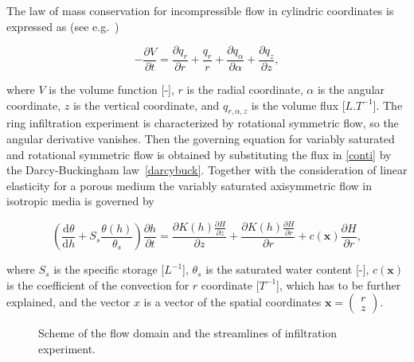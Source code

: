 \documentclass[review]{myarticle}
\newenvironment{lineq}
    {\begin{linenomath*}
    \begin{equation}
    }
    { 
    \end{equation} 
    \end{linenomath*}
    }
\newcommand{\dd}{\mathrm{d}}
\renewcommand{\vec}{\mathbf}
\begin{document}
The law of mass conservation  for incompressible flow in cylindric coordinates  is expressed as (see e.g.~\citep{bear1979})
\begin{lineq}
\label{conti}
-\frac{\partial V}{\partial t} = \frac{\partial q_r}{\partial r} + \frac{q_r}{r} + \frac{\partial q_{\alpha}}{\partial \alpha} + \frac{\partial q_z}{\partial z} ,
\end{lineq}
where $V$ is the volume function [-],  $r$ is the radial coordinate, $\alpha$ is the angular coordinate,  $z$ is the vertical coordinate, and $q_{r, \alpha, z}$ is the  volume flux [$L.T^{-1}$]. The ring infiltration experiment is characterized by rotational symmetric flow, so the angular derivative vanishes. Then the governing equation for  variably saturated and rotational symmetric flow is obtained by substituting the flux in \eqref{conti} by the Darcy-Buckingham law~\eqref{darcybuck}. Together with the consideration of linear elasticity for a porous medium the variably saturated axisymmetric flow in isotropic media is governed by
\begin{lineq}
\label{richaxi}
\left(\frac{\dd \theta}{\dd h} + S_s\frac{\theta(h)}{\theta_s} \right) \frac{\partial h}{\partial t}  =  \frac{\partial K(h) \frac{\partial H}{\partial z}}{\partial z} + \frac{\partial K(h) \frac{\partial H}{\partial r}}{\partial r} + c(\vec{x})\frac{\partial H}{\partial r},
\end{lineq}
where $S_s$ is the specific storage [$L^{-1}$], $\theta_s$ is the saturated water content [-],  $c(\vec{x})$ is the coefficient of the convection for $r$ coordinate [$T^{-1}$], which has to be further explained, and the vector $x$ is a vector of the spatial coordinates $\vec{x}=\left( \begin{smallmatrix} r \\ z \end{smallmatrix} \right)$.

 \begin{figure}
\centering
{}
 \caption{Scheme of the flow domain and the streamlines of infiltration experiment. }
 \label{valecproudy}
\end{figure}
\end{document}
